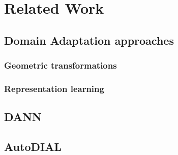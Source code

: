 \documentclass[../main.tex]{subfiles}
\begin{document}
    \chapter{Related Work}

    \section{Domain Adaptation approaches}
        \subsection{Geometric transformations}
        \subsection{Representation learning}

    \section{DANN}

    \section{AutoDIAL}
\end{document}
